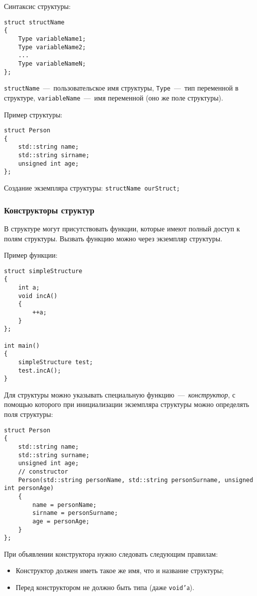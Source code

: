 Синтаксис структуры:
\begin{lstlisting}
struct structName
{
    Type variableName1;
    Type variableName2;
    ...
    Type variableNameN;
};
\end{lstlisting}

\lstinline|structName|~---~пользовательское имя структуры, \lstinline|Type|~---~тип переменной в структуре, \lstinline|variableName|~---~имя переменной (оно же поле структуры).

Пример структуры:
\begin{lstlisting}
struct Person
{
    std::string name;
    std::string sirname;
    unsigned int age;
};
\end{lstlisting}

Создание экземпляра структуры:
\lstinline{structName ourStruct;}

\subsubsection{Конструкторы структур}

В структуре могут присутствовать функции, которые имеют полный доступ к полям структуры. Вызвать функцию можно через экземпляр структуры.

Пример функции:

\begin{lstlisting}
struct simpleStructure
{
    int a;
    void incA()
    {
        ++a;
    }
};

int main()
{
    simpleStructure test;
    test.incA();
}
\end{lstlisting}

Для структуры можно указывать специальную функцию~---~\emph{конструктор}, с помощью которого при инициализации экземпляра структуры можно определять поля структуры:
\begin{lstlisting}
struct Person
{
    std::string name;
    std::string surname;
    unsigned int age;
    // constructor
    Person(std::string personName, std::string personSurname, unsigned int personAge)
    {
        name = personName;
        sirname = personSurname;
        age = personAge;
    }
};
\end{lstlisting}

При объявлении конструктора нужно следовать следующим правилам:
\begin{itemize}
    \item Конструктор должен иметь такое же имя, что и название структуры;
    \item Перед конструктором не должно быть типа (даже \texttt{void'}а).
\end{itemize}

